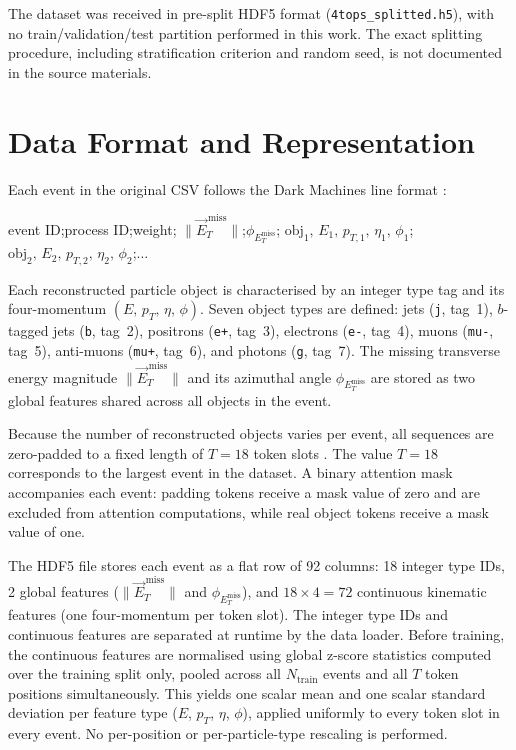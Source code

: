 The dataset was received in pre-split HDF5 format (\texttt{4tops\_splitted.h5}), with no
train/validation/test partition performed in this work. The exact splitting procedure,
including stratification criterion and random seed, is not documented in the source
materials. 

\section{Data Format and Representation}
\label{sec:dataset_format}

Each event in the original CSV follows the Dark Machines line format
\cite{Aarrestad:2021oeb,builtjesAttentionStrengthsPhysical2025}:
\begin{center}
event ID;\enspace process ID;\enspace weight;\enspace
$\|\vec{E}_T^{\,\text{miss}}\|$;\enspace $\phi_{E_T^{\text{miss}}}$;\enspace
$\mathrm{obj}_1,\,E_1,\,p_{T,1},\,\eta_1,\,\phi_1$;\enspace
$\mathrm{obj}_2,\,E_2,\,p_{T,2},\,\eta_2,\,\phi_2$;\enspace$\ldots$
\end{center}
Each reconstructed particle object is characterised by an integer type tag and its
four-momentum $(E,\,p_T,\,\eta,\,\phi)$. Seven object types are defined: jets (\texttt{j},
tag~1), $b$-tagged jets (\texttt{b}, tag~2), positrons (\texttt{e+}, tag~3), electrons
(\texttt{e-}, tag~4), muons (\texttt{mu-}, tag~5), anti-muons (\texttt{mu+}, tag~6), and
photons (\texttt{g}, tag~7). The missing transverse energy magnitude
$\|\vec{E}_T^{\,\text{miss}}\|$ and its azimuthal angle $\phi_{E_T^{\text{miss}}}$ are
stored as two global features shared across all objects in the event.

Because the number of reconstructed objects varies per event, all sequences are
zero-padded to a fixed length of $T = 18$ token slots \cite{Visive:2026mjd}. The value
$T = 18$ corresponds to the largest event in the dataset. A binary attention mask
accompanies each event: padding tokens receive a mask value of zero and are excluded from
attention computations, while real object tokens receive a mask value of one.

The HDF5 file stores each event as a flat row of 92 columns: 18 integer type IDs,
2 global features ($\|\vec{E}_T^{\,\text{miss}}\|$ and $\phi_{E_T^{\text{miss}}}$), and
$18 \times 4 = 72$ continuous kinematic features (one four-momentum per token slot).
The integer type IDs and continuous features are separated at runtime by the data loader.
Before training, the continuous features are normalised using global z-score statistics
computed over the training split only, pooled across all $N_{\text{train}}$ events and all
$T$ token positions simultaneously. This yields one scalar mean and one scalar standard
deviation per feature type ($E$, $p_T$, $\eta$, $\phi$), applied uniformly to every token
slot in every event. No per-position or per-particle-type rescaling is performed.

